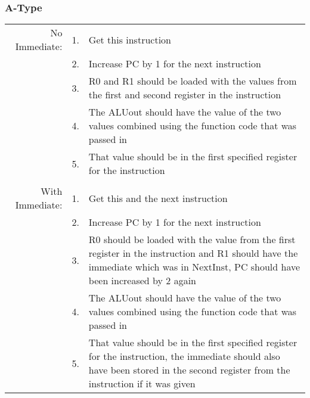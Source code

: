 		\subsubsection{A-Type}
			\begin{tabular}{ r  r  p{12cm} }
				No Immediate:   & 1. & Get this instruction\\
				                & 2. & Increase PC by 1 for the next instruction\\
				                & 3. & R0 and R1 should be loaded with the values from the first and second register in the instruction\\
				                & 4. & The ALUout should have the value of the two values combined using the function code that was passed in\\
				                & 5. & That value should be in the first specified register for the instruction\\
				                &    & \\
				With Immediate: & 1. & Get this and the next instruction\\
				                & 2. & Increase PC by 1 for the next instruction\\
				                & 3. & R0 should be loaded with the value from the first register in the instruction and R1 should have the immediate which was in NextInst, PC should have been increased by 2 again\\
				                & 4. & The ALUout should have the value of the two values combined using the function code that was passed in\\
				                & 5. & That value should be in the first specified register for the instruction, the immediate should also have been stored in the second register from the instruction if it was given\\
			\end{tabular}
